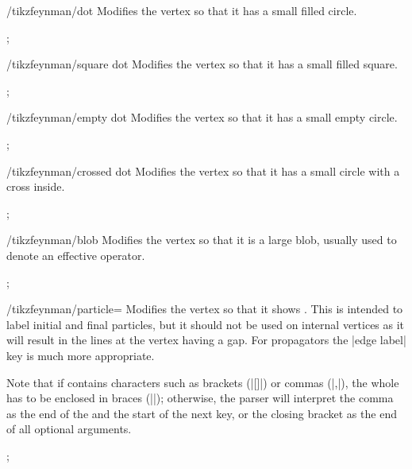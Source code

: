 \documentclass[a4paper,final]{ltxdoc}
\begin{document}
\begin{key}{/tikzfeynman/dot}
  Modifies the vertex so that it has a small filled circle.

\begin{codeexample}[]
;
\end{codeexample}
\end{key}

\begin{key}{/tikzfeynman/square dot}
  Modifies the vertex so that it has a small filled square.

\begin{codeexample}[]
;
\end{codeexample}
\end{key}

\begin{key}{/tikzfeynman/empty dot}
  Modifies the vertex so that it has a small empty circle.

\begin{codeexample}[]
;
\end{codeexample}
\end{key}

\begin{key}{/tikzfeynman/crossed dot}
  Modifies the vertex so that it has a small circle with a cross inside.

\begin{codeexample}[]
;
\end{codeexample}
\end{key}

\begin{key}{/tikzfeynman/blob}
  Modifies the vertex so that it is a large blob, usually used to denote an
  effective operator.

\begin{codeexample}[]
;
\end{codeexample}
\end{key}

\begin{key}{/tikzfeynman/particle=}
  Modifies the vertex so that it shows .  This is intended to label
  initial and final particles, but it should not be used on internal vertices as
  it will result in the lines at the vertex having a gap.  For propagators the
  |edge label| key is much more appropriate.

  Note that if  contains characters such as brackets (|[]|) or
  commas (|,|), the whole  has to be enclosed in braces (|{}|);
  otherwise, the parser will interpret the comma as the end of the 
  and the start of the next key, or the closing bracket as the end of all
  optional arguments.

\begin{codeexample}[]
;
\end{codeexample}
\end{key}
\end{document}
